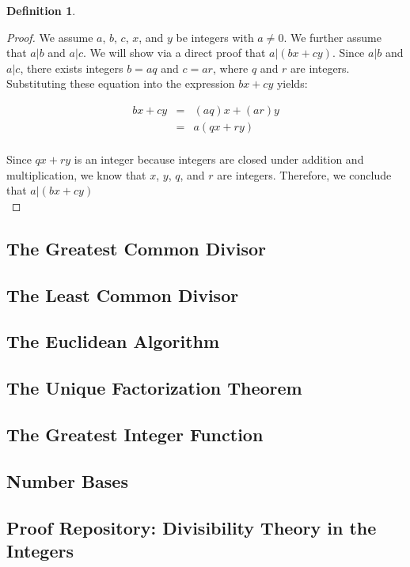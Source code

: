 \documentclass{book}
\theoremstyle{definition}
\newtheorem{definition}{Definition}[section]
\theoremstyle{remark}
\begin{document}
\begin{definition}
\begin{proof}
We assume $a$, $b$, $c$, $x$, and $y$ be integers with $a \neq 0$. We further assume that $a | b$ and $a | c$. We will show via a direct proof that $a | (bx + cy)$. Since $a | b$ and $a | c$, there exists integers $b = aq$ and $c = ar$, where $q$ and $r$ are integers. Substituting these equation into the expression $bx + cy$ yields:

\begin{eqnarray*}
	bx + cy & = & (aq)x + (ar)y \nonumber \\	
	& = & a(qx + ry) \nonumber \\	
\end{eqnarray*}

Since $qx + ry$ is an integer because integers are closed under addition  and multiplication, we know that $x$, $y$, $q$, and $r$ are integers. Therefore, we conclude that $a | (bx + cy)$ \\
\end{proof}

\end{definition}



\newpage
\subsection{The Greatest Common Divisor}
\subsection{The Least Common Divisor}
\subsection{The Euclidean Algorithm}
\subsection{The Unique Factorization Theorem}
\subsection{The Greatest Integer Function}
\subsection{Number Bases}


\newpage
\subsection*{Proof Repository: Divisibility Theory in the Integers}
\end{document}

